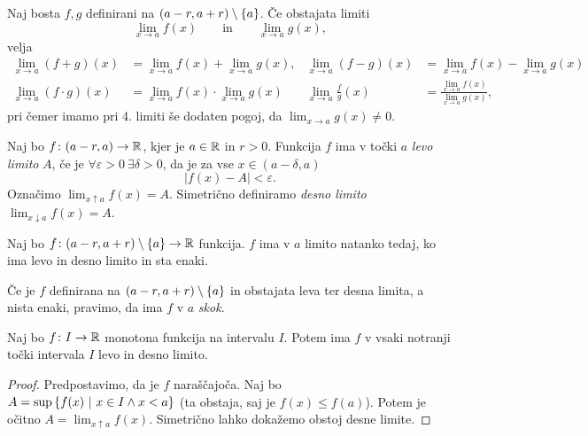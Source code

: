 \documentclass[12pt, a4paper]{article}
\begin{document}
\begin{trditev}
Naj bosta $f,g$ definirani na $(a-r,a+r)\setminus\left\{a\right\}$. Če obstajata limiti
\[
\lim_{x\to a} f(x)\qquad\text{in}\qquad \lim_{x\to a} g(x),
\]
velja
\begin{align*}
\lim_{x\to a} (f+g)(x)&=\lim_{x\to a} f(x)+\lim_{x\to a} g(x), & \lim_{x\to a} (f-g)(x)&=\lim_{x\to a} f(x)-\lim_{x\to a} g(x)
\\
\lim_{x\to a} (f\cdot g)(x)&=\lim_{x\to a} f(x)\cdot \lim_{x\to a} g(x) & \lim_{x\to a} \frac{f}{g}(x)&=\frac{\displaystyle\lim_{x\to a} f(x)}{\displaystyle\lim_{x\to a} g(x)},
\end{align*}
pri čemer imamo pri 4. limiti še dodaten pogoj, da $\displaystyle\lim_{x\to a}g(x)\ne 0$.
\end{trditev}

\begin{definicija}
Naj bo $f\colon (a-r,a)\to\mathbb{R}$, kjer je $a\in\mathbb{R}$ in $r>0$. Funkcija $f$ ima v točki $a$ \emph{levo limito} $A$, če je $\forall\varepsilon>0~\exists\delta>0$, da je za vse $x\in(a-\delta,a)$
\[
\left|f(x)-A\right|<\varepsilon.
\]
Označimo $\displaystyle\lim_{x\uparrow a}f(x)=A$. Simetrično definiramo \emph{desno limito} $\displaystyle\lim_{x\downarrow a}f(x)=A$.
\end{definicija}

\begin{trditev}
Naj bo $f\colon(a-r,a+r)\setminus\left\{a\right\}\to\mathbb{R}$ funkcija. $f$ ima v $a$ limito natanko tedaj, ko ima levo in desno limito in sta enaki.
\end{trditev}

\obvs

\begin{opomba}
Če je $f$ definirana na $(a-r,a+r)\setminus\left\{a\right\}$ in obstajata leva ter desna limita, a nista enaki, pravimo, da ima $f$ v $a$ \emph{skok}.
\end{opomba}

\begin{izrek}
Naj bo $f\colon I\to\mathbb{R}$ monotona funkcija na intervalu $I$. Potem ima $f$ v vsaki notranji točki intervala $I$ levo in desno limito.
\end{izrek}

\begin{proof}
Predpostavimo, da je $f$ naraščajoča. Naj bo $A=\sup\left\{f(x)~\middle\vert~x\in I\land x<a\right\}$ (ta obstaja, saj je $f(x)\leq f(a)$). Potem je očitno $A=\displaystyle\lim_{x\uparrow a}f(x)$. Simetrično lahko dokažemo obstoj desne limite.
\end{proof}
\end{document}
